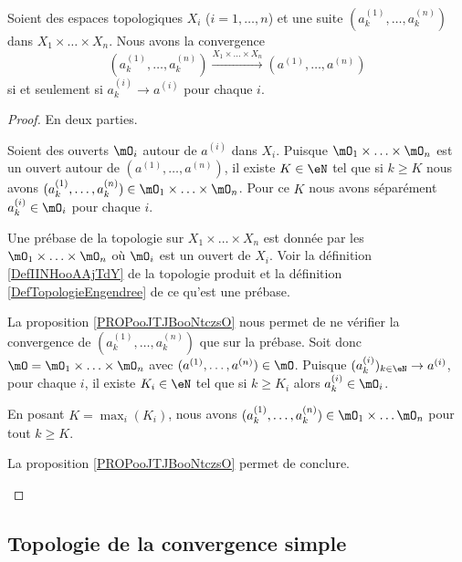 \begin{proposition}
	Soient des espaces topologiques \( X_i\) (\( i=1,\ldots, n\)) et une suite \( (a^{(1)}_k,\ldots, a^{(n)}_k)\) dans \( X_1\times\ldots \times X_n\). Nous avons la convergence
	\begin{equation}
		(a^{(1)}_k,\ldots, a^{(n)}_k)\stackrel{X_1\times\ldots \times X_n}{\longrightarrow}(a^{(1)},\ldots, a^{(n)})
	\end{equation}
	si et seulement si \( a^{(i)}_k\to a^{(i)}\) pour chaque \( i\).
\end{proposition}

\begin{proof}
	En deux parties.
	\begin{subproof}
		Soient des ouverts \( \mO_i\) autour de \( a^{(i)}\) dans \( X_i\). Puisque \( \mO_1\times \ldots\times \mO_n\) est un ouvert autour de \( (a^{(1)},\ldots, a^{(n)})\), il existe \( K\in \eN\) tel que si \( k\geq K\) nous avons \( (a^{(1)}_k,\ldots, a^{(n)}_k)\in \mO_1\times \ldots \times \mO_n\). Pour ce \( K\) nous avons séparément \( a^{(i)}_k\in \mO_i\) pour chaque \( i\).

		Une prébase de la topologie sur \( X_1\times \ldots\times X_n\) est donnée par les \( \mO_1\times \ldots \times \mO_n\) où \( \mO_i\) est un ouvert de \( X_i\). Voir la définition \ref{DefIINHooAAjTdY} de la topologie produit et la définition \ref{DefTopologieEngendree} de ce qu'est une prébase.

		La proposition \ref{PROPooJTJBooNtczsO} nous permet de ne vérifier la convergence de \( (a^{(1)}_k,\ldots, a^{(n)}_k)\) que sur la prébase. Soit donc \(\mO= \mO_1\times \ldots \times \mO_n\) avec \( (a^{(1)},\ldots, a^{(n)})\in \mO\). Puisque \( (a^{(i)}_k)_{k\in \eN}\to a^{(i)}\), pour chaque \( i\), il existe \( K_i\in \eN\) tel que si \( k\geq K_i\) alors \( a^{(i)}_k\in \mO_i\).

		En posant \( K=\max_i(K_i)\), nous avons \( (a^{(1)}_k,\ldots, a^{(n)}_k)\in \mO_1\times \ldots \mO_n\) pour tout \( k\geq K\).

		La proposition \ref{PROPooJTJBooNtczsO} permet de conclure.
	\end{subproof}
\end{proof}


\subsection{Topologie de la convergence simple}

